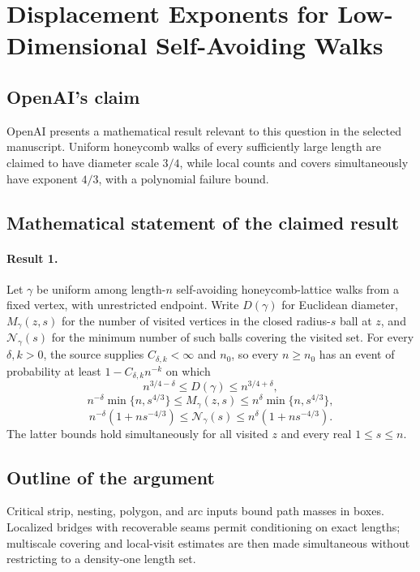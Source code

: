 \documentclass[11pt]{article}
\begin{document}
\section*{Displacement Exponents for Low-Dimensional Self-Avoiding Walks}

\subsection{OpenAI's claim}
OpenAI presents a mathematical result relevant to this question in the selected manuscript. Uniform honeycomb walks of every sufficiently large length are claimed to have diameter scale $3/4$, while local counts and covers simultaneously have exponent $4/3$, with a polynomial failure bound.

\subsection{Mathematical statement of the claimed result}
\paragraph{Result 1.} Let \(\gamma\) be uniform among length-\(n\) self-avoiding honeycomb-lattice walks from a fixed vertex, with unrestricted endpoint. Write \(D(\gamma)\) for Euclidean diameter, \(M_\gamma(z,s)\) for the number of visited vertices in the closed radius-\(s\) ball at \(z\), and \(\mathcal N_\gamma(s)\) for the minimum number of such balls covering the visited set. For every \(\delta,k>0\), the source supplies \(C_{\delta,k}<\infty\) and \(n_0\), so every \(n\ge n_0\) has an event of probability at least \(1-C_{\delta,k}n^{-k}\) on which
\[
 n^{3/4-\delta}\le D(\gamma)\le n^{3/4+\delta},
\]
\[
 n^{-\delta}\min\{n,s^{4/3}\}\le M_\gamma(z,s)\le n^\delta\min\{n,s^{4/3}\},
\]
\[
 n^{-\delta}(1+ns^{-4/3})\le\mathcal N_\gamma(s)\le n^\delta(1+ns^{-4/3}).
\]
The latter bounds hold simultaneously for all visited \(z\) and every real \(1\le s\le n\).

\subsection{Outline of the argument}
Critical strip, nesting, polygon, and arc inputs bound path masses in boxes. Localized bridges with recoverable seams permit conditioning on exact lengths; multiscale covering and local-visit estimates are then made simultaneous without restricting to a density-one length set.
\end{document}
